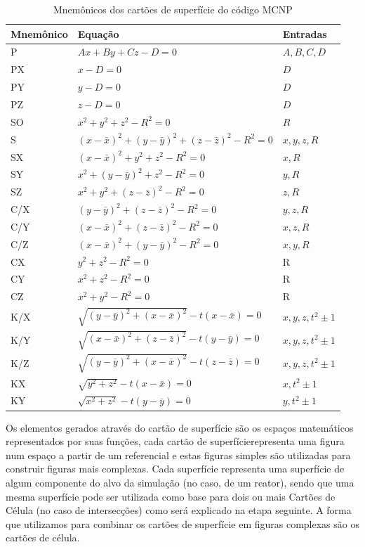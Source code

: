 \documentclass[
	12pt,				%
	openany,			%
	twoside,			%
	a4paper,			%
	english,			%
	french,				%
	spanish,			%
	brazil				%
	]{abntex2}
\begin{document}
\newpage
\begin{center}
\begin{longtable}{|l|l|l|}
\caption[Mnemônicos dos cartões de superfície do código MCNP]{Mnemônicos dos cartões de superfície do código MCNP}

\label{SUPMNEMONICS} \\

\hline

Mnemônico & Equação & Entradas\tabularnewline
\hline 
\hline 
P & $Ax+By+Cz-D=0$ & $A,B,C,D$\tabularnewline
\hline 
PX & $x-D=0$ & $D$\tabularnewline
\hline 
PY & $y-D=0$ & $D$\tabularnewline
\hline 
PZ & $z-D=0$ & $D$\tabularnewline
\hline 
SO & $x^{2}+y^{2}+z^{2}-R^{2}=0$ & $R$\tabularnewline
\hline 
S & $(x-\bar{x})^{2}+(y-\bar{y})^{2}+(z-\bar{z})^{2}-R^{2}=0$ & $x,y,z,R$\tabularnewline
\hline 
SX & $(x-\bar{x})^{2}+y^{2}+z^{2}-R^{2}=0$ & $x,R$\tabularnewline
\hline 
SY & $x^{2}+(y-\bar{y})^{2}+z^{2}-R^{2}=0$ & $y,R$\tabularnewline
\hline 
SZ & $x^{2}+y^{2}+(z-\bar{z})^{2}-R^{2}=0$ & $z,R$\tabularnewline
\hline 
C/X & $(y-\bar{y})^{2}+(z-\bar{z})^{2}-R^{2}=0$ & $y,z,R$\tabularnewline
\hline 
C/Y & $(x-\bar{x})^{2}+(z-\bar{z})^{2}-R^{2}=0$ & $x,z,R$\tabularnewline
\hline 
C/Z & $(x-\bar{x})^{2}+(y-\bar{y})^{2}-R^{2}=0$ & $x,y,R$\tabularnewline
\hline 
CX & $y^{2}+z^{2}-R^{2}=0$ & R\tabularnewline
\hline 
CY & $x^{2}+z^{2}-R^{2}=0$ & R\tabularnewline
\hline 
CZ & $x^{2}+y^{2}-R^{2}=0$ & R\tabularnewline
\hline 
K/X & $\sqrt{(y-\bar{y})^{2}+(x-\bar{x})^{2}}-t(x-\bar{x})=0$ & $x,y,z,t^{2}\pm1$\tabularnewline
\hline 
K/Y & $\sqrt{(x-\bar{x})^{2}+(z-\bar{z})^{2}}-t(y-\bar{y})=0$ & $x,y,z,t^{2}\pm1$\tabularnewline
\hline 
K/Z & $\sqrt{(y-\bar{y})^{2}+(x-\bar{x})^{2}}-t(z-\bar{z})=0$ & $x,y,z,t^{2}\pm1$\tabularnewline
\hline 
KX & $\sqrt{y^{2}+z^{2}}-t(x-\bar{x})=0$ & $x,t^{2}\pm1$\tabularnewline
\hline 
KY & $\sqrt{x^{2}+z^{2}}-t(y-\bar{y})=0$ & $y,t^{2}\pm1$\tabularnewline
\hline

\end{longtable}
\end{center}


Os elementos gerados através do cartão de superfície são os espaços matemáticos representados por suas funções, cada cartão de superfícierepresenta uma figura num espaço a partir de um referencial e estas figuras simples são utilizadas para construir figuras mais complexas. Cada superfície representa uma superfície de algum componente do alvo da simulação (no caso, de um reator), sendo que uma mesma superfície pode ser utilizada como base para dois ou mais Cartões de Célula (no caso de intersecções) como será explicado na etapa seguinte. A forma que utilizamos para combinar os cartões de superfície em figuras
complexas são os cartões de célula.
\end{document}
